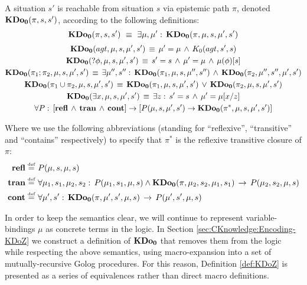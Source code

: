 \begin{defnL}
 A situation $s'$ is reachable
from situation $s$ via epistemic path $\pi$, denoted $\mathbf{KDo_{0}}(\pi,s,s')$,
according to the following definitions:\label{def:KDoZ}\[
\mathbf{KDo_{0}}(\pi,s,s')\,\,\equiv\,\,\exists\mu,\mu':\,\mathbf{KDo_{0}}(\pi,\mu,s,\mu',s')\]
 \begin{gather*}
\mathbf{KDo_{0}}(agt,\mu,s,\mu',s')\,\equiv\,\mu'=\mu\,\wedge\, K_{0}(agt,s',s)\\
\mathbf{KDo_{0}}(?\phi,\mu,s,\mu',s')\,\equiv\, s'=s\,\wedge\,\mu'=\mu\,\wedge\,\mu(\phi)[s]\\
\mathbf{KDo_{0}}(\pi_{1};\pi_{2},\mu,s,\mu',s')\,\equiv\,\exists\mu'',s'':\,\mathbf{KDo_{0}}(\pi_{1},\mu,s,\mu'',s'')\,\wedge\,\mathbf{KDo_{0}}(\pi_{2},\mu'',s'',\mu',s')\\
\mathbf{KDo_{0}}(\pi_{1}\cup\pi_{2},\mu,s,\mu',s')\,\equiv\,\mathbf{KDo_{0}}(\pi_{1},\mu,s,\mu',s')\,\vee\,\mathbf{KDo_{0}}(\pi_{2},\mu,s,\mu',s')\\
\mathbf{KDo_{0}}(\exists x,\mu,s,\mu',s')\,\equiv\,\exists z:\, s'=s\,\wedge\,\mu'=\mu[x/z]\\
\forall P:\,\left[\mathbf{refl}\,\wedge\,\mathbf{tran}\,\wedge\,\mathbf{cont}\right]\rightarrow\left[P(\mu,s,\mu',s')\rightarrow\mathbf{KDo_{0}}(\pi^{*},\mu,s,\mu',s')\right]\end{gather*}

\end{defnL}
Where we use the following abbreviations (standing for {}``reflexive'',
{}``transitive'' and {}``contains'' respectively) to specify that
$\pi^{*}$ is the reflexive transitive closure of $\pi$:\begin{align*}
\mathbf{refl}\stackrel{\mbox{\tiny def}}{=} & \,\, P(\mu,s,\mu,s)\\
\mathbf{tran\stackrel{\mbox{\tiny def}}{=}} & \,\,\forall\mu_{1},s_{1},\mu_{2},s_{2}:\, P(\mu_{1},s_{1},\mu,s)\wedge\mathbf{KDo_{0}}(\pi,\mu_{2},s_{2},\mu_{1},s_{1})\,\rightarrow\, P(\mu_{2},s_{2},\mu,s)\\
\mathbf{cont}\stackrel{\mbox{\tiny def}}{=} & \,\,\forall\mu',s':\,\mathbf{KDo_{0}}(\pi,\mu',s',\mu,s)\,\rightarrow\, P(\mu',s',\mu,s)\end{align*}


In order to keep the semantics clear, we will continue to represent
variable-bindings $\mu$ as concrete terms in the logic. In Section
\ref{sec:CKnowledge:Encoding-KDoZ} we construct a definition of $\mathbf{KDo_{0}}$
that removes them from the logic while respecting the above semantics,
using macro-expansion into a set of mutually-recursive Golog procedures.
For this reason, Definition \ref{def:KDoZ} is presented as a series
of equivalences rather than direct macro definitions.

